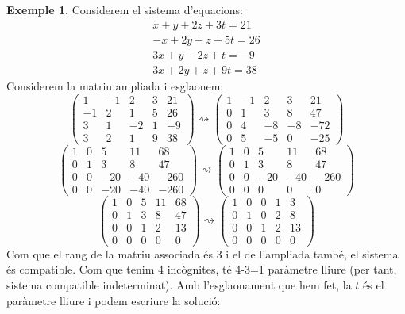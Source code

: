 \documentclass[a4paper,12pt,twoside]{article}
\newcommand{\1}{\mathbf{1}}
\newcommand{\0}{\mathbf{0}}
\theoremstyle{definition}
\newtheorem{exemple}[teorema]{Exemple}
\theoremstyle{remark}
\begin{document}
\begin{exemple}\label{exem:SCI}
Considerem el sistema d'equacions:
$$
\begin{array}{c}
x + y + 2z + 3t = 21 \\
-x+2y+z+5t=26\\
3x+y-2z+t=-9\\
3x+2y+z+9t=38
\end{array}
$$
Considerem la matriu ampliada i esglaonem:
$$\left(\begin{array}{cccc|c}
1 & -1 & 2 & 3 & 21 \\
-1 & 2 & 1 & 5 & 26 \\
3 & 1 & -2 & 1 & -9\\
3 & 2 & 1 & 9 & 38
\end{array}
\right)
\rightsquigarrow
\left(\begin{array}{cccc|c}
1 & -1 & 2 & 3 & 21 \\
0 & 1 & 3 & 8 & 47 \\
0 & 4 & -8 & -8 & -72\\
0 & 5 & -5 & 0 & -25
\end{array}
\right)
$$
$$
\left(\begin{array}{cccc|c}
1 & 0 & 5 & 11 & 68 \\
0 & 1 & 3 & 8 & 47 \\
0 & 0 & -20 & -40 & -260\\
0 & 0 & -20 & -40 & -260
\end{array}
\right)
\rightsquigarrow
\left(\begin{array}{cccc|c}
1 & 0 & 5 & 11 & 68 \\
0 & 1 & 3 & 8 & 47 \\
0 & 0 & -20 & -40 & -260\\
0 & 0 & 0 & 0 & 0
\end{array}
\right)
$$
$$
\left(\begin{array}{cccc|c}
1 & 0 & 5 & 11 & 68 \\
0 & 1 & 3 & 8 & 47 \\
0 & 0 & 1 & 2 & 13\\
0 & 0 & 0 &  0 & 0
\end{array}
\right)
\rightsquigarrow
\left(\begin{array}{cccc|c}
1 & 0 & 0 & 1 & 3 \\
0 & 1 & 0 & 2 & 8 \\
0 & 0 & 1 & 2 & 13\\
0 & 0 & 0 &  0 & 0
\end{array}
\right)
$$
Com que el rang de la matriu associada és 3 i el de l'ampliada també, el sistema és compatible. Com que tenim 4 incògnites, té 4-3=1 paràmetre lliure (per tant, sistema compatible indeterminat). Amb l'esglaonament que hem fet, la $t$ és el paràmetre lliure i podem escriure la solució:

\end{exemple}
\end{document}
